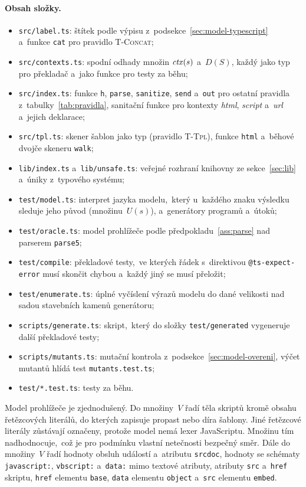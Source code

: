 \paragraph{Obsah složky.}
\begin{itemize}
    \item \texttt{src/label.ts}: štítek podle výpisu z~podsekce~\ref{sec:model-typescript} a~funkce \texttt{cat} pro pravidlo \textsc{T-Concat};
    \item \texttt{src/contexts.ts}: spodní odhady množin $\mathit{ctx}(s)$ a~$D(S)$, každý jako typ pro překladač a~jako funkce pro testy za běhu;
    \item \texttt{src/index.ts}: funkce \texttt{h}, \texttt{parse}, \texttt{sanitize}, \texttt{send} a~\texttt{out} pro ostatní pravidla z~tabulky~\ref{tab:pravidla}, sanitační funkce pro kontexty \emph{html}, \emph{script} a~\emph{url} a~jejich deklarace;
    \item \texttt{src/tpl.ts}: skener šablon jako typ (pravidlo \textsc{T-Tpl}), funkce \texttt{html} a~běhové dvojče skeneru \texttt{walk};
    \item \texttt{lib/index.ts} a~\texttt{lib/unsafe.ts}: veřejné rozhraní knihovny ze sekce~\ref{sec:lib} a~úniky z~typového systému;
    \item \texttt{test/model.ts}: interpret jazyka modelu,~který u~každého znaku výsledku sleduje jeho původ (množinu~$U(s)$), a~generátory programů a~útoků;
    \item \texttt{test/oracle.ts}: model prohlížeče podle předpokladu~\ref{ass:parse} nad parserem \texttt{parse5};
    \item \texttt{test/compile}: překladové testy,~ve kterých řádek s~direktivou \texttt{@ts-expect-error} musí skončit chybou a~každý jiný se musí přeložit;
    \item \texttt{test/enumerate.ts}: úplné vyčíslení výrazů modelu do dané velikosti nad sadou stavebních kamenů generátoru;
    \item \texttt{scripts/generate.ts}: skript,~který do složky \texttt{test/generated} vygeneruje další překladové testy;
    \item \texttt{scripts/mutants.ts}: mutační kontrola z~podsekce~\ref{sec:model-overeni}, výčet mutantů hlídá test \texttt{mutants.test.ts};
    \item \texttt{test/*.test.ts}: testy za běhu.
\end{itemize}

Model prohlížeče je zjednodušený. Do množiny~$V$ řadí těla skriptů kromě obsahu řetězcových literálů, do kterých zapisuje propast nebo díra šablony. Jiné řetězcové literály zůstávají označeny, protože model nemá lexer JavaScriptu. Množinu tím nadhodnocuje,~což je pro podmínku vlastní netečnosti bezpečný směr. Dále do množiny~$V$ řadí hodnoty obsluh událostí a~atributu \texttt{srcdoc}, hodnoty se schématy \texttt{javascript:}, \texttt{vbscript:} a~\texttt{data:} mimo textové atributy, atributy \texttt{src} a~\texttt{href} skriptu, \texttt{href} elementu \texttt{base}, \texttt{data} elementu \texttt{object} a~\texttt{src} elementu \texttt{embed}.

